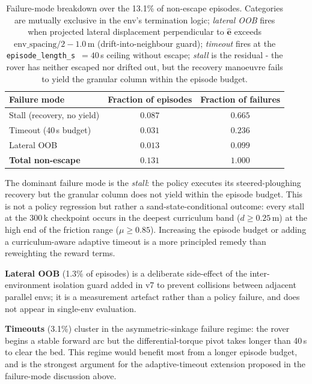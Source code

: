 \documentclass[conference]{IEEEtran}
\begin{document}
\begin{table}[!htbp]
  \centering
  \caption{Failure-mode breakdown over the 13.1\% of non-escape episodes.
    Categories are mutually exclusive in the env's termination logic;
    \emph{lateral OOB} fires when projected lateral displacement
    perpendicular to $\hat{\mathbf{e}}$ exceeds $\textrm{env\_spacing}/2 - 1.0$\,m
    (drift-into-neighbour guard); \emph{timeout} fires at the
    \texttt{episode\_length\_s}~$=40$\,s ceiling without escape; \emph{stall}
    is the residual - the rover has neither escaped nor drifted out, but
    the recovery manoeuvre fails to yield the granular column within the
    episode budget.}
  \label{tab:failures}
  \renewcommand{\arraystretch}{1.2}
  \begin{tabular}{@{}lcc@{}}
    \toprule
    \textbf{Failure mode} & \textbf{Fraction of episodes} & \textbf{Fraction of failures} \\
    \midrule
    Stall (recovery, no yield)  & $0.087$  & $0.665$ \\
    Timeout (40\,s budget)      & $0.031$  & $0.236$ \\
    Lateral OOB                 & $0.013$  & $0.099$ \\
    \midrule
    \textbf{Total non-escape}   & $\mathbf{0.131}$ & $1.000$ \\
    \bottomrule
  \end{tabular}
\end{table}

The dominant failure mode is the \emph{stall}: the policy executes its
steered-ploughing recovery but the granular column does not yield within the
episode budget. This is not a policy regression but rather a
sand-state-conditional outcome: every stall at the 300\,k checkpoint
occurs in the deepest curriculum band ($d \geq 0.25$\,m) at the high end of
the friction range ($\mu \geq 0.85$). Increasing the episode budget or
adding a curriculum-aware adaptive timeout is a more principled remedy than
reweighting the reward terms.

\textbf{Lateral OOB} (1.3\% of episodes) is a deliberate side-effect of
the inter-environment isolation guard added in v7 to prevent collisions
between adjacent parallel envs; it is a measurement artefact rather than a
policy failure, and does not appear in single-env evaluation.

\textbf{Timeouts} (3.1\%) cluster in the asymmetric-sinkage failure regime:
the rover begins a stable forward arc but the differential-torque pivot
takes longer than 40\,s to clear the bed. This regime would benefit most
from a longer episode budget, and is the strongest argument for the
adaptive-timeout extension proposed in the failure-mode discussion above.
\end{document}
